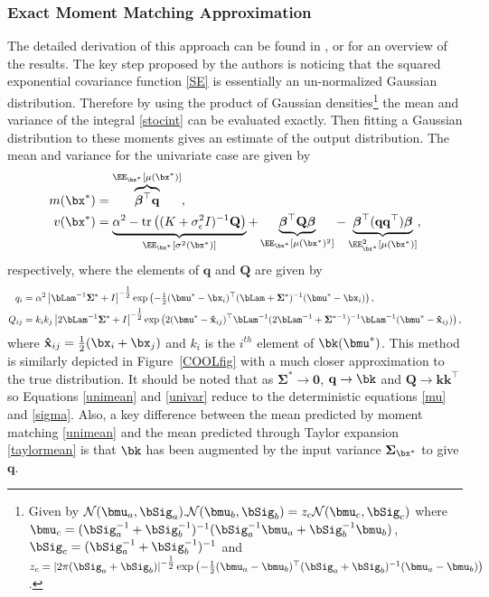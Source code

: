 \subsubsection{Exact Moment Matching Approximation}
The detailed derivation of this approach can be found in \cite{QGR03}, or \cite{QGLR03} for an overview of the results. The key step proposed by the authors is noticing that the squared exponential covariance function \eqref{SE} is essentially an un-normalized Gaussian distribution. Therefore by using the product of Gaussian densities\footnote{
Given by $\mathcal{N}(\bmu_a,\bSig_a).\mathcal{N}(\bmu_b,\bSig_b) = z_c\mathcal{N}(\bmu_c,\bSig_c)$ where $\bmu_c = (\bSig_a^{-1} + \bSig_b^{-1})^{-1}(\bSig_a^{-1}\bmu_a + \bSig_b^{-1}\bmu_b)$, $\bSig_c = (\bSig_a^{-1} + \bSig_b^{-1})^{-1}$ and $z_c = |2\pi(\bSig_a + \bSig_b)|^{-\tfrac{1}{2}} \exp\left(-\tfrac{1}{2}(\bmu_a - \bmu_b)^\top(\bSig_a + \bSig_b)^{-1}(\bmu_a - \bmu_b) \right)$.
} the mean and variance of the integral \eqref{stocint} can be evaluated exactly. Then fitting a Gaussian distribution to these moments gives an estimate of the output distribution. The mean and variance for the univariate case are given by
\begin{align}
m(\bx^*) &=  \overbrace{\boldsymbol{\beta}^\top \mathbf{q}}^{\EE_{\bx^*}[\mu(\bx^*)]}, \label{unimean}\\
v(\bx^*) &= \underbrace{\alpha^2 - \mathrm{tr}\left( (K+\sigma^2_\epsilon I)^{-1} \mathbf{Q}  \right)}_{\EE_{\bx^*}[\sigma^2(\bx^*)] }
+ \underbrace{\boldsymbol{\beta}^\top \mathbf{Q} \boldsymbol{\beta} }_{\EE_{\bx^*}[\mu(\bx^*)^2]} 
- \underbrace{ \boldsymbol{\beta}^\top (\mathbf{q} \mathbf{q}^\top) \boldsymbol{\beta}}_{\EE^2_{\bx^*}[\mu(\bx^*)]}, \label{univar}
\end{align}
respectively, where the elements of $\mathbf{q}$ and $\mathbf{Q}$ are given by
\begin{align}
q_i &= \alpha^2 \left|\bLam^{-1}\mathbf{\Sigma}^* + I  \right|^{-\tfrac{1}{2}} 
\exp \left(-\tfrac{1}{2} (\bmu^*  -  \bx_i)^\top  (\bLam + \mathbf{\Sigma}^*)^{-1}  (\bmu^*  -  \bx_i)     \right),  \\
 Q_{ij} 
&= k_i k_j \left|2\bLam^{-1}\mathbf{\Sigma}^* + I  \right|^{-\tfrac{1}{2}} \exp  \left( 2(\bmu^*  -  \mathbf{\hat x}_{ij})^\top \bLam^{-1} (2\bLam^{-1} + \mathbf{\Sigma}^{*-1})^{-1}  \bLam^{-1}  (\bmu^*  -  \mathbf{\hat x}_{ij}) \right),
\end{align}
where $\mathbf{\hat x}_{ij} = \tfrac{1}{2}(\bx_i + \bx_j)$ and $k_i$ is the $i^{th}$ element of $\bk(\bmu^*)$. This method is similarly depicted in Figure~\ref{COOLfig} with a much closer approximation to the true distribution. It should be noted that as $\mathbf{\Sigma}^*  \rightarrow \mathbf{0}$, $\mathbf{q} \rightarrow \bk$ and $\mathbf{Q} \rightarrow  \mathbf{kk}^\top$ so Equations \eqref{unimean} and \eqref{univar} reduce to the deterministic equations \eqref{mu} and \eqref{sigma}. Also, a key difference between the mean predicted by moment matching \eqref{unimean} and the mean predicted through Taylor expansion \eqref{taylormean} is that $\bk$ has been augmented by the input variance $\mathbf{\Sigma}_{\bx^*}$ to give $\mathbf{q}$.

